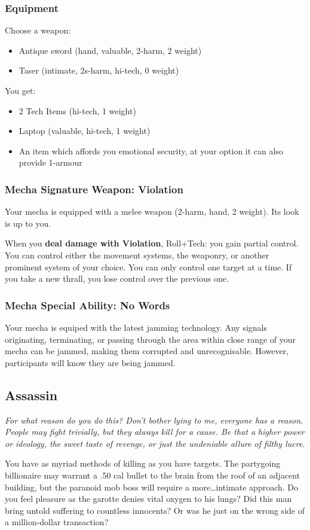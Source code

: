 \subsubsection{Equipment}
Choose a weapon:
\begin{itemize}
\item Antique sword (hand, valuable, 2-harm, 2 weight)
\item Taser (intimate, 2s-harm, hi-tech, 0 weight)
\end{itemize}

You get:
\begin{itemize}
\item 2 Tech Items (hi-tech, 1 weight)
\item Laptop (valuable, hi-tech, 1 weight)
\item An item which affords you emotional security, at your option it can also provide 1-armour
\end{itemize}

\subsubsection{Mecha Signature Weapon: Violation}
Your mecha is equipped with a melee weapon (2-harm, hand, 2 weight). Its look is up to you.

When you \textbf{deal damage with Violation}, Roll+Tech:
{you gain partial control. You can control either the movement systems, the weaponry, or another prominent system of your choice.}
You can only control one target at a time. If you take a new thrall, you lose control over the previous one.

\subsubsection{Mecha Special Ability: No Words}
Your mecha is equiped with the latest jamming technology. Any signals originating, terminating, or passing through the area within close range of your mecha can be jammed, making them corrupted and unrecognisable. However, participants will know they are being jammed.



\subsection{Assassin}
{\itshape For what reason do you do this? Don't bother lying to me,
  everyone has a reason. People may fight trivially, but they always
  kill for a cause. Be that a higher power or ideology, the sweet
  taste of revenge, or just the undeniable allure of filthy lucre.

You have as myriad methods of killing as you have targets. The
partygoing billionaire may warrant a .50 cal bullet to the brain from
the roof of an adjacent building, but the paranoid mob boss will
require a more\ldots intimate approach. Do you feel pleasure as the
garotte denies vital oxygen to his lungs? Did this man bring untold
suffering to countless innocents? Or was he just on the wrong side of
a million-dollar transaction?}

